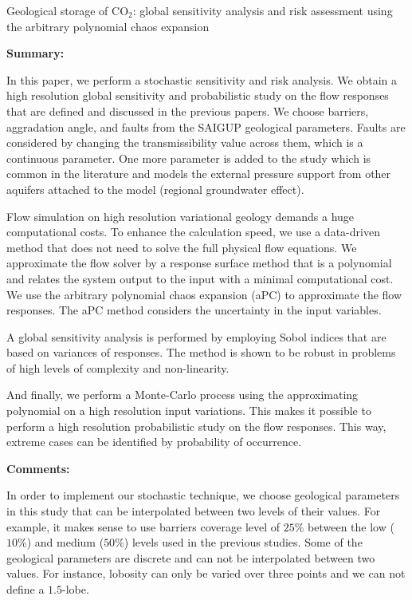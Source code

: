 %
%
{Geological storage of $\mbox{CO}_2$: global sensitivity analysis and risk
assessment using the arbitrary polynomial chaos expansion}
{\textbf{Summary:}

In this paper, we perform a stochastic sensitivity and risk analysis. We obtain
a high resolution global sensitivity and probabilistic study on the flow
responses that are defined and discussed in the previous papers. We choose
barriers, aggradation angle, and
faults from the SAIGUP geological parameters. Faults are considered by changing
the transmissibility value across them, which
is a continuous parameter. One more parameter is added to the study which is
common in the literature and models the external pressure support from other
aquifers attached to the model (regional groundwater effect).

Flow simulation on high resolution variational geology demands a huge
computational costs. To enhance the calculation speed, we use a data-driven
method that does not need to solve the full physical flow equations. We
approximate the flow solver by a response surface method that is a polynomial
and relates the system output to the input with a minimal computational cost.
We use the arbitrary polynomial chaos expansion (aPC) to approximate the
flow responses. The aPC method considers the uncertainty in the input variables.

A global sensitivity analysis is performed by employing Sobol indices that are
based on variances of responses. The method is shown to be robust in problems
of high levels of complexity and non-linearity.  

And finally, we perform a Monte-Carlo process using the approximating polynomial
on a high resolution input variations. This makes it possible to perform a high
resolution probabilistic study on the flow responses. This way, extreme cases
can be identified by probability of occurrence.

\vspace{0.5cm}
\noindent\textbf{Comments:}

In order to implement our stochastic technique, we choose geological parameters
in this study that can be interpolated between two levels of their values. For
example, it makes sense to use barriers coverage level of $25\%$ between the low
($10\%$) and medium ($50\%$) levels used in the previous studies. Some of the
geological parameters are discrete and can not be interpolated between two
values. For instance, lobosity can only be varied over three points and we can
not define a $1.5$-lobe. 

}

